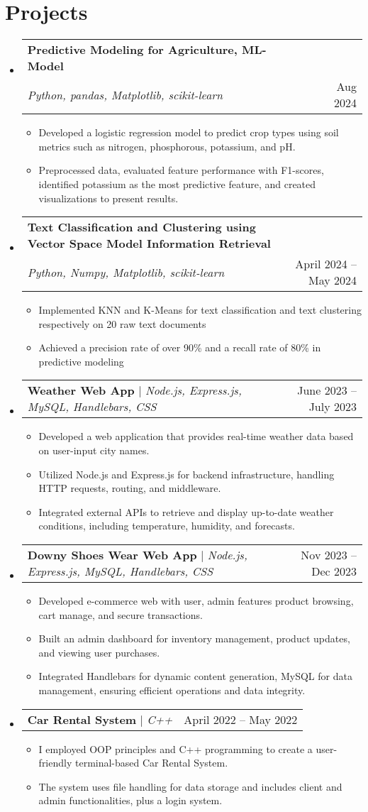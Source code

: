 \documentclass[letterpaper,11pt]{article}
\makeatletter
\newcommand{\resumeItem}[1]{
  \item\small{
    {#1 \vspace{-2pt}}
  }
}
\newcommand{\resumeProjectHeading}[2]{
    \item
    \begin{tabular*}{0.97\textwidth}{l@{\extracolsep{\fill}}r}
      \small#1 & #2 \\
    \end{tabular*}\vspace{-7pt}
}
\newcommand{\resumeSubHeadingListStart}{\begin{itemize}[leftmargin=0.15in, label={}]}
\newcommand{\resumeSubHeadingListEnd}{\end{itemize}}
\newcommand{\resumeItemListStart}{\begin{itemize}}
\newcommand{\resumeItemListEnd}{\end{itemize}\vspace{-5pt}}
\makeatother
\begin{document}
\section{Projects}
    \resumeSubHeadingListStart
       \resumeProjectHeading
	{\textbf{Predictive Modeling for Agriculture,  ML-Model} \\ 
	\emph{Python, pandas, Matplotlib, scikit-learn}}{Aug 2024}
          \resumeItemListStart
            \resumeItem{Developed a logistic regression model to predict crop types using soil metrics such as nitrogen, phosphorous, potassium, and pH.}
            \resumeItem{Preprocessed data, evaluated feature performance with F1-scores, identified potassium as the most predictive feature, and created visualizations to present results.}
          \resumeItemListEnd
       \resumeProjectHeading
	{\textbf{Text Classification and Clustering using Vector Space Model Information Retrieval} \\ 
	\emph{Python, Numpy, Matplotlib, scikit-learn}}{April 2024 -- May 2024}
          \resumeItemListStart
            \resumeItem{Implemented KNN and K-Means for text classification and text clustering respectively on 20 raw text documents}
            \resumeItem{Achieved a precision rate of over 90\% and a recall rate of 80\% in predictive modeling}
          \resumeItemListEnd
	  \resumeProjectHeading
	{\textbf{Weather Web App} $|$ \emph{Node.js, Express.js, MySQL, Handlebars, CSS}}{June 2023 -- July 2023}
          \resumeItemListStart
            \resumeItem{Developed a web application that provides real-time weather data based on user-input city names.}
            \resumeItem{Utilized Node.js and Express.js for backend infrastructure, handling HTTP requests, routing, and middleware.}
            \resumeItem{Integrated external APIs to retrieve and display up-to-date weather conditions, including temperature, humidity, and forecasts.}
          \resumeItemListEnd
       \resumeProjectHeading
          {\textbf{Downy Shoes Wear Web App} $|$ \emph{Node.js, Express.js, MySQL, Handlebars, CSS}}{Nov 2023 -- Dec 2023}
          \resumeItemListStart
            \resumeItem{Developed e-commerce web with user, admin features product browsing, cart manage, and secure transactions.}
            \resumeItem{Built an admin dashboard for inventory management, product updates, and viewing user purchases.}
            \resumeItem{Integrated Handlebars for dynamic content generation, MySQL for data management, ensuring efficient operations and data integrity.}
          \resumeItemListEnd
       \resumeProjectHeading
          {\textbf{Car Rental System} $|$ \emph{C++}}{April 2022 -- May 2022}
          \resumeItemListStart
            \resumeItem{I employed OOP principles and C++ programming to create a user-friendly terminal-based Car Rental System.}
            \resumeItem{The system uses file handling for data storage and includes client and admin functionalities, plus a login system.}
          \resumeItemListEnd
    \resumeSubHeadingListEnd
\end{document}
